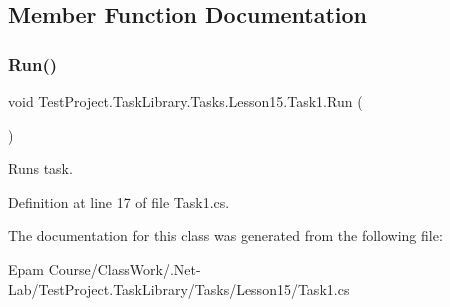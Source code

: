 \subsection{Member Function Documentation}
\mbox{\label{class_test_project_1_1_task_library_1_1_tasks_1_1_lesson15_1_1_task1_a42f198f1a19c83fa9d4ce408ebb153cf}} 
\subsubsection{\texorpdfstring{Run()}{Run()}}
{\footnotesize\ttfamily void Test\+Project.\+Task\+Library.\+Tasks.\+Lesson15.\+Task1.\+Run (\begin{DoxyParamCaption}{ }\end{DoxyParamCaption})}



Runs task. 



Definition at line 17 of file Task1.\+cs.



The documentation for this class was generated from the following file\+:\begin{DoxyCompactItemize}
\item 
Epam Course/\+Class\+Work/.\+Net-\/\+Lab/\+Test\+Project.\+Task\+Library/\+Tasks/\+Lesson15/Task1.\+cs\end{DoxyCompactItemize}
